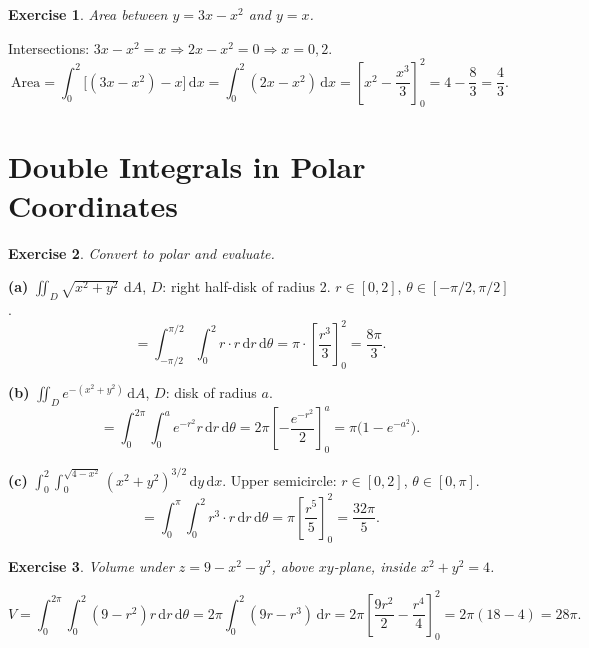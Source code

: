 \documentclass[12pt,a4paper]{article}
\theoremstyle{exstyle}
\newtheorem{exercise}{Exercise}[section]
\newcommand{\dif}[1]{\,\mathrm{d}#1}
\begin{document}
\begin{exercise}
Area between $y=3x-x^2$ and $y=x$.
\end{exercise}
\begin{solbox}
Intersections: $3x-x^2=x\Rightarrow 2x-x^2=0\Rightarrow x=0,2$.
\[
  \text{Area}=\int_0^2\bigl[(3x-x^2)-x\bigr]\dif{x}=\int_0^2(2x-x^2)\dif{x}
  =\left[x^2-\frac{x^3}{3}\right]_0^2=4-\frac{8}{3}=\frac{4}{3}.
\]
\end{solbox}

\section{Double Integrals in Polar Coordinates}

\begin{exercise}
Convert to polar and evaluate.
\end{exercise}
\begin{solbox}
\textbf{(a)} $\iint_D\sqrt{x^2+y^2}\,\dif{A}$, $D$: right half-disk of radius 2.
$r\in[0,2]$, $\theta\in[-\pi/2,\pi/2]$.
\[
  =\int_{-\pi/2}^{\pi/2}\!\int_0^2 r\cdot r\dif{r}\dif{\theta}
  =\pi\cdot\left[\frac{r^3}{3}\right]_0^2=\frac{8\pi}{3}.
\]

\textbf{(b)} $\iint_D e^{-(x^2+y^2)}\dif{A}$, $D$: disk of radius $a$.
\[
  =\int_0^{2\pi}\!\int_0^a e^{-r^2}r\dif{r}\dif{\theta}
  =2\pi\left[-\frac{e^{-r^2}}{2}\right]_0^a=\pi\bigl(1-e^{-a^2}\bigr).
\]

\textbf{(c)} $\int_0^2\!\int_0^{\sqrt{4-x^2}}(x^2+y^2)^{3/2}\dif{y}\dif{x}$.
Upper semicircle: $r\in[0,2]$, $\theta\in[0,\pi]$.
\[
  =\int_0^\pi\!\int_0^2 r^3\cdot r\dif{r}\dif{\theta}
  =\pi\left[\frac{r^5}{5}\right]_0^2=\frac{32\pi}{5}.
\]
\end{solbox}

\begin{exercise}
Volume under $z=9-x^2-y^2$, above $xy$-plane, inside $x^2+y^2=4$.
\end{exercise}
\begin{solbox}
\[
  V=\int_0^{2\pi}\!\int_0^2(9-r^2)r\dif{r}\dif{\theta}
  =2\pi\int_0^2(9r-r^3)\dif{r}
  =2\pi\left[\frac{9r^2}{2}-\frac{r^4}{4}\right]_0^2=2\pi(18-4)=\boxed{28\pi}.
\]
\end{solbox}
\end{document}
